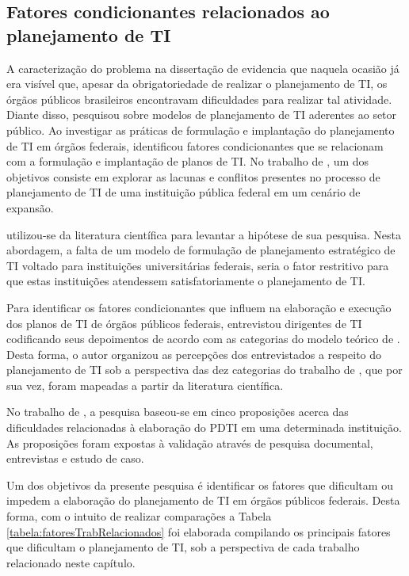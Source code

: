 \subsection{Fatores condicionantes relacionados ao planejamento de TI}
A caracterização do problema na dissertação de  evidencia que naquela ocasião já era visível que, apesar da obrigatoriedade de realizar o planejamento de TI, os órgãos públicos brasileiros encontravam dificuldades para realizar tal atividade. Diante disso,  pesquisou sobre modelos de planejamento de TI aderentes ao setor público. Ao investigar as práticas de formulação e implantação do planejamento de TI em órgãos federais,  identificou fatores condicionantes que se relacionam com a formulação e implantação de planos de TI. No trabalho de , um dos objetivos consiste em explorar as lacunas e conflitos presentes no processo de planejamento de TI de uma instituição pública federal em um cenário de expansão.


 utilizou-se da literatura científica para levantar a hipótese de sua pesquisa. Nesta abordagem, a falta de um modelo de formulação de planejamento estratégico de TI voltado para instituições universitárias federais, seria o fator restritivo para que estas instituições atendessem satisfatoriamente o planejamento de TI. 

Para identificar os fatores condicionantes que influem na elaboração e execução dos planos de TI de órgãos públicos federais,  entrevistou dirigentes de TI codificando seus depoimentos de acordo com as categorias do modelo teórico de . Desta forma, o autor organizou as percepções dos entrevistados a respeito do planejamento de TI sob a perspectiva das dez categorias do trabalho de , que por sua vez, foram mapeadas a partir da literatura científica.

No trabalho de , a pesquisa baseou-se em cinco proposições acerca das dificuldades relacionadas à elaboração do PDTI em uma determinada instituição. As proposições foram expostas à validação através de pesquisa documental, entrevistas e estudo de caso.

Um dos objetivos da presente pesquisa é identificar os fatores que dificultam ou impedem a elaboração do planejamento de TI em órgãos públicos federais. Desta forma, com o intuito de realizar comparações a Tabela \ref{tabela:fatoresTrabRelacionados} foi elaborada compilando os principais fatores que dificultam o planejamento de TI, sob a perspectiva de cada trabalho relacionado neste capítulo.

